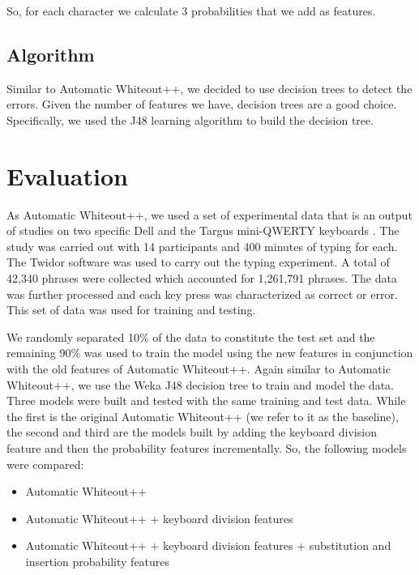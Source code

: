 \documentclass[letterpaper, 10 pt, conference]{ieeeconf}  %
\begin{document}
So, for each character we calculate 3 probabilities that we add as features.

\subsection{Algorithm}

Similar to Automatic Whiteout++, we decided to use decision trees to detect the errors. Given the number of features we have, decision trees are a good choice. Specifically, we used the J48 learning algorithm to build the decision tree.

\section{Evaluation}

As Automatic Whiteout++, we used a set of experimental data that is an output of studies on two specific Dell and the Targus mini-QWERTY keyboards \cite{clawson2006mobile}. The study was carried out with 14 participants and 400 minutes of typing for each. The Twidor software was used to carry out the typing experiment. A total of 42,340 phrases were collected which accounted for 1,261,791 phrases. The data was further processed and each key press was characterized as correct or error. This set of data was used for training and testing.

We randomly separated 10\% of the data to constitute the test set and the remaining 90\% was used to train the model using the new features in conjunction with the old features of Automatic Whiteout++. Again similar to Automatic Whiteout++, we use the Weka J48 decision tree to train and model the data. Three models were built and tested with the same training and test data. While the first is the original Automatic Whiteout++ (we refer to it as the baseline), the second and third are the models built by adding the keyboard division feature and then the probability features incrementally. So, the following models were compared:
\begin{itemize}
\item Automatic Whiteout++
\item Automatic Whiteout++ + keyboard division features
\item Automatic Whiteout++ + keyboard division features + substitution and insertion probability features
\end{itemize}
\end{document}
